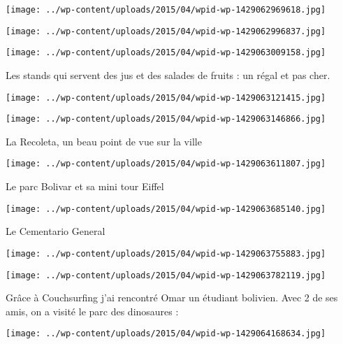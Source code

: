 \centerline{\texttt{[image: ../wp-content/uploads/2015/04/wpid-wp-1429062969618.jpg]} } 
 \newline
 \newline
\centerline{\texttt{[image: ../wp-content/uploads/2015/04/wpid-wp-1429062996837.jpg]} } 
 \newline
 \newline
\centerline{\texttt{[image: ../wp-content/uploads/2015/04/wpid-wp-1429063009158.jpg]} } 
 \newline
 Les stands qui servent des jus et des salades de fruits : un régal et pas cher.  \newline
 \newline
\centerline{\texttt{[image: ../wp-content/uploads/2015/04/wpid-wp-1429063121415.jpg]} } 
 \newline
 \newline
\centerline{\texttt{[image: ../wp-content/uploads/2015/04/wpid-wp-1429063146866.jpg]} } 
 \newline
 La Recoleta, un beau point de vue sur la ville \newline
 \newline
\centerline{\texttt{[image: ../wp-content/uploads/2015/04/wpid-wp-1429063611807.jpg]} } 
 \newline
 Le parc Bolivar et sa mini tour Eiffel \newline
 \newline
\centerline{\texttt{[image: ../wp-content/uploads/2015/04/wpid-wp-1429063685140.jpg]} } 
 \newline
 Le Cementario General \newline
 \newline
\centerline{\texttt{[image: ../wp-content/uploads/2015/04/wpid-wp-1429063755883.jpg]} } 
 \newline
 \newline
\centerline{\texttt{[image: ../wp-content/uploads/2015/04/wpid-wp-1429063782119.jpg]} } 
 \newline
 Grâce à Couchsurfing j'ai rencontré Omar un étudiant bolivien. Avec 2 de ses amis, on a visité le parc des dinosaures : \newline
 \newline
\centerline{\texttt{[image: ../wp-content/uploads/2015/04/wpid-wp-1429064168634.jpg]} } 
 \newline
 \newline
